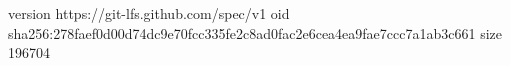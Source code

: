 version https://git-lfs.github.com/spec/v1
oid sha256:278faef0d00d74dc9e70fcc335fe2c8ad0fac2e6cea4ea9fae7ccc7a1ab3c661
size 196704
